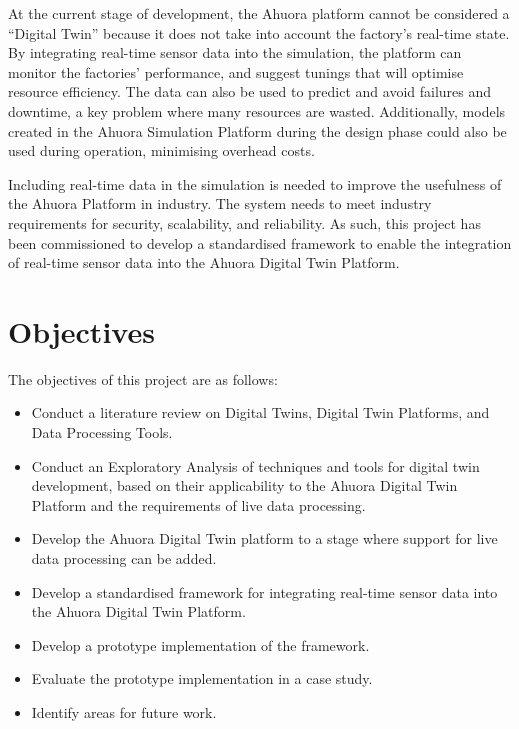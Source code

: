 \documentclass[12pt]{report}
\begin{document}
At the current stage of development, the Ahuora platform cannot be considered a ``Digital Twin'' because it does not take into account the factory's real-time state.
By integrating real-time sensor data into the simulation, the platform can monitor the factories' performance, and suggest tunings that will optimise resource efficiency.
The data can also be used to predict and avoid failures and downtime, a key problem where many resources are wasted.
Additionally, models created in the Ahuora Simulation Platform during the design phase could also be used during operation, minimising overhead costs.

Including real-time data in the simulation is needed to improve the usefulness of the Ahuora Platform in industry.
The system needs to meet industry requirements for security, scalability, and reliability. As such, this project
has been commissioned to develop a standardised framework to enable the integration of real-time sensor data into the Ahuora Digital Twin Platform.


\section{Objectives}

The objectives of this project are as follows:
\begin{itemize}
    \item Conduct a literature review on Digital Twins, Digital Twin Platforms, and Data Processing Tools.
    \item Conduct an Exploratory Analysis of techniques and tools for digital twin development, based on their applicability to the Ahuora Digital Twin Platform and the requirements of live data processing.
    \item Develop the Ahuora Digital Twin platform to a stage where support for live data processing can be added.
    \item Develop a standardised framework for integrating real-time sensor data into the Ahuora Digital Twin Platform.
    \item Develop a prototype implementation of the framework.
    \item Evaluate the prototype implementation in a case study.
    \item Identify areas for future work.
\end{itemize}
\end{document}
